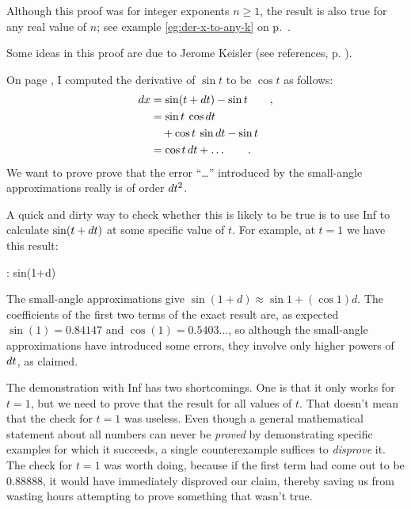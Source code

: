 Although this proof was for integer exponents $n\ge 1$, the result is also true for any
real value of $n$; see example \ref{eg:der-x-to-any-k}
on p.~\pageref{eg:der-x-to-any-k}.


Some ideas in this proof are due to Jerome Keisler (see references, p. \pageref{references}).

On page \pageref{eg:derivative-of-sin}, I computed the derivative of $\sin t$ to be $\cos t$
as follows:
\begin{align*}
  \mathop{d\!} x &= \sin(t+\mathop{d\!} t)-\sin t \qquad , \\
         &= \sin t \: \cos \mathop{d\!} t \\
         &\quad + \cos t \: \sin \mathop{d\!} t - \sin t \\
         &= \cos t \mathop{d\!} t + \ldots\qquad .
\end{align*}
We want to prove prove that the error ``\ldots'' introduced by the small-angle approximations really
is of order $\mathop{d\!} t^2$. 

A quick and dirty way to check whether this is likely to be true is to
use Inf to calculate $\sin(t+\mathop{d\!} t)$ at some specific value of $t$. For example, at $t=1$ we have
this result:
\begin{Code}
  \ii : sin(1+d)
\end{Code}
The small-angle approximations give $\sin(1+d)\approx\sin 1+(\cos 1)d$.
The coefficients of the first two terms of the exact result are, as expected $\sin(1)=0.84147$ and $\cos(1)=0.5403\ldots$, so although the
small-angle approximations have introduced some errors, they involve only higher powers of $\mathop{d\!} t$, as claimed.

The demonstration with Inf has two shortcomings. One is that it only works for $t=1$, but we need to
prove that the result for all values of $t$. That doesn't mean that the check for $t=1$ was useless.
Even though a general mathematical statement about all numbers can never be \emph{proved} by demonstrating
specific examples for which it succeeds, a single counterexample suffices to \emph{disprove} it.
The check for $t=1$ was worth doing, because if the first term had come out to be
0.88888, it would have immediately disproved our claim, thereby
saving us from wasting hours attempting to prove something that wasn't true.

